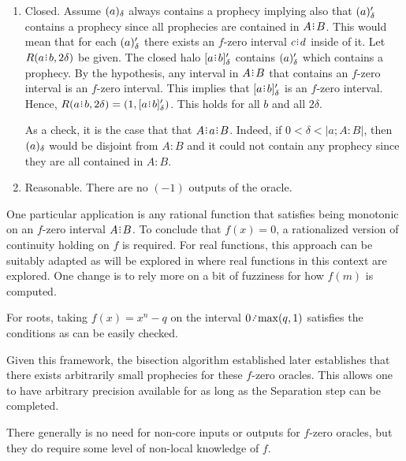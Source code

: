 \documentclass[12pt]{article}
\begin{document}
\begin{enumerate}
\item Closed. Assume $(a)_{\delta}$ always contains a prophecy implying also that $(a)_{\delta}'$ contains a prophecy since all prophecies are contained in $A \rint B$. This would mean that for each $(a)_{\delta}'$ there exists an $f$-zero interval $c\rint d$ inside of it. Let $R(a\rint b, 2\delta)$ be given. The closed halo $\clhalo{a\rint b}'$ contains $(a)_{\delta}'$ which contains a prophecy. By the hypothesis, any interval in $A\rint B$ that contains an $f$-zero interval is an $f$-zero interval. This implies that  $\clhalo{a\rint b}'$ is an $f$-zero interval. Hence, $R(a\rint b, 2 \delta) = (1, \clhalo{a\rint b}') $. This holds for all $b$ and all $2\delta$.

As a check, it is the case that that $A \rint  a\rint  B$. Indeed, if $0 < \delta < |a; A:B|$, then $(a)_{\delta}$ would be disjoint from $A:B$ and it could not contain any prophecy since they are all contained in $A:B$. 

\item Reasonable. There are no $(-1)$ outputs of the oracle. 

\end{enumerate}

One particular application is any rational function that satisfies being monotonic on an $f$-zero interval $A\rint B$. To conclude that $f(x)=0$, a rationalized version of continuity holding on $f$ is required. For real functions, this approach can be suitably adapted as will be explored in \cite{taylor23funora} where real functions in this context are explored. One change is to rely more on a bit of fuzziness for how $f(m)$ is computed. 

For roots, taking $f(x) = x^n - q$ on the interval $0\lte \max(q, 1)$ satisfies the conditions as can be easily checked. 

Given this framework, the bisection algorithm established later establishes that there exists arbitrarily small prophecies for these $f$-zero oracles. This allows one to have arbitrary precision available for as long as the Separation step can be completed. 

There generally is no need for non-core inputs or outputs for $f$-zero oracles, but they do require some level of non-local knowledge of $f$. 
\end{document}
